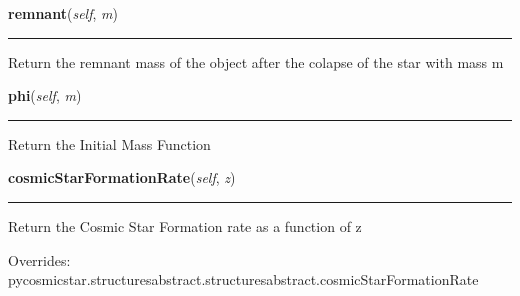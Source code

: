     \vspace{0.5ex}

\hspace{.8\funcindent}\begin{boxedminipage}{\funcwidth}

    \raggedright \textbf{remnant}(\textit{self}, \textit{m})

    \vspace{-1.5ex}

    \rule{\textwidth}{0.5\fboxrule}
\setlength{\parskip}{2ex}
    Return the remnant mass of the object after the colapse of the star 
    with mass m

\setlength{\parskip}{1ex}
    \end{boxedminipage}

    \label{pycosmicstar:cosmicstarformation:cosmicstarformation:phi}

    \vspace{0.5ex}

\hspace{.8\funcindent}\begin{boxedminipage}{\funcwidth}

    \raggedright \textbf{phi}(\textit{self}, \textit{m})

    \vspace{-1.5ex}

    \rule{\textwidth}{0.5\fboxrule}
\setlength{\parskip}{2ex}
    Return the Initial Mass Function

\setlength{\parskip}{1ex}
    \end{boxedminipage}

    \vspace{0.5ex}

\hspace{.8\funcindent}\begin{boxedminipage}{\funcwidth}

    \raggedright \textbf{cosmicStarFormationRate}(\textit{self}, \textit{z})

    \vspace{-1.5ex}

    \rule{\textwidth}{0.5\fboxrule}
\setlength{\parskip}{2ex}
    Return the Cosmic Star Formation rate as a function of z

\setlength{\parskip}{1ex}
      Overrides: pycosmicstar.structuresabstract.structuresabstract.cosmicStarFormationRate

    \end{boxedminipage}

